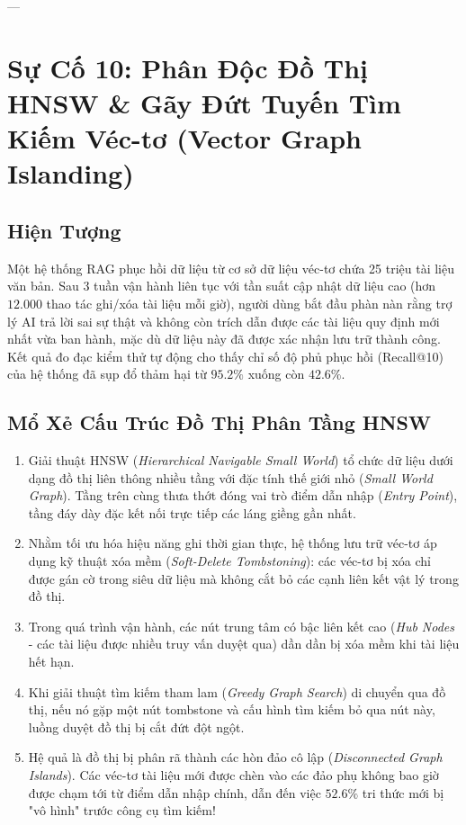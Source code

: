---

\section{Sự Cố 10: Phân Độc Đồ Thị HNSW \& Gãy Đứt Tuyến Tìm Kiếm Véc-tơ (Vector Graph Islanding)}
\label{sec:postmortem-hnsw-graph-islanding}

\subsection{Hiện Tượng}
Một hệ thống RAG phục hồi dữ liệu từ cơ sở dữ liệu véc-tơ chứa 25 triệu tài liệu văn bản.
Sau 3 tuần vận hành liên tục với tần suất cập nhật dữ liệu cao (hơn $12.000$ thao tác ghi/xóa tài liệu mỗi giờ), người dùng bắt đầu phàn nàn rằng trợ lý AI trả lời sai sự thật và không còn trích dẫn được các tài liệu quy định mới nhất vừa ban hành, mặc dù dữ liệu này đã được xác nhận lưu trữ thành công.
Kết quả đo đạc kiểm thử tự động cho thấy chỉ số độ phủ phục hồi (Recall@10) của hệ thống đã sụp đổ thảm hại từ $95.2\%$ xuống còn $42.6\%$.

\subsection{Mổ Xẻ Cấu Trúc Đồ Thị Phân Tầng HNSW}
\begin{enumerate}
  \item Giải thuật HNSW (\textit{Hierarchical Navigable Small World}) tổ chức dữ liệu dưới dạng đồ thị liên thông nhiều tầng với đặc tính thế giới nhỏ (\textit{Small World Graph}). Tầng trên cùng thưa thớt đóng vai trò điểm dẫn nhập (\textit{Entry Point}), tầng đáy dày đặc kết nối trực tiếp các láng giềng gần nhất.
  \item Nhằm tối ưu hóa hiệu năng ghi thời gian thực, hệ thống lưu trữ véc-tơ áp dụng kỹ thuật xóa mềm (\textit{Soft-Delete Tombstoning}): các véc-tơ bị xóa chỉ được gán cờ  trong siêu dữ liệu mà không cắt bỏ các cạnh liên kết vật lý trong đồ thị.
  \item Trong quá trình vận hành, các nút trung tâm có bậc liên kết cao (\textit{Hub Nodes} - các tài liệu được nhiều truy vấn duyệt qua) dần dần bị xóa mềm khi tài liệu hết hạn.
  \item Khi giải thuật tìm kiếm tham lam (\textit{Greedy Graph Search}) di chuyển qua đồ thị, nếu nó gặp một nút tombstone và cấu hình tìm kiếm bỏ qua nút này, luồng duyệt đồ thị bị cắt đứt đột ngột.
  \item Hệ quả là đồ thị bị phân rã thành các hòn đảo cô lập (\textit{Disconnected Graph Islands}). Các véc-tơ tài liệu mới được chèn vào các đảo phụ không bao giờ được chạm tới từ điểm dẫn nhập chính, dẫn đến việc $52.6\%$ tri thức mới bị "vô hình" trước công cụ tìm kiếm!
\end{enumerate}

